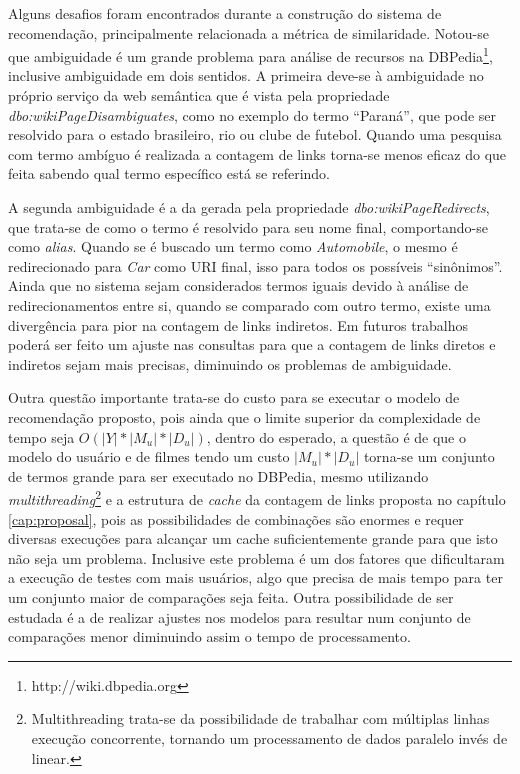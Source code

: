 Alguns desafios foram encontrados durante a construção do sistema de recomendação, principalmente relacionada a métrica de similaridade. Notou-se que ambiguidade é um grande problema para análise de recursos na DBPedia\footnote{http://wiki.dbpedia.org}, inclusive ambiguidade em dois sentidos. A primeira deve-se à ambiguidade no próprio serviço da web semântica que é vista pela propriedade \textit{dbo:wikiPageDisambiguates}, como no exemplo do termo \enquote{Paraná}, que pode ser resolvido para o estado brasileiro, rio ou clube de futebol. Quando uma pesquisa com termo ambíguo é realizada a contagem de links torna-se menos eficaz do que feita sabendo qual termo específico está se referindo. 

A segunda ambiguidade é a da gerada pela propriedade \textit{dbo:wikiPageRedirects}, que trata-se de como o termo é resolvido para seu nome final, comportando-se como \textit{alias}. Quando se é buscado um termo como \textit{Automobile}, o mesmo é redirecionado para \textit{Car} como \ac{URI} final, isso para todos os possíveis \enquote{sinônimos}. Ainda que no sistema sejam considerados termos iguais devido à análise de redirecionamentos entre si, quando se comparado com outro termo, existe uma divergência para pior na contagem de links indiretos. Em futuros trabalhos poderá ser feito um ajuste nas consultas para que a contagem de links diretos e indiretos sejam mais precisas, diminuindo os problemas de ambiguidade.

Outra questão importante trata-se do custo para se executar o modelo de recomendação proposto, pois ainda que o limite superior da complexidade de tempo seja $O(|Y| * |M_u| * |D_u|)$, dentro do esperado, a questão é de que o modelo do usuário e de filmes tendo um custo $|M_u| * |D_u|$ torna-se um conjunto de termos grande para ser executado no DBPedia, mesmo utilizando \textit{multithreading}\footnote{Multithreading trata-se da possibilidade de trabalhar com múltiplas linhas execução concorrente, tornando um processamento de dados paralelo invés de linear.} e a estrutura de \textit{cache} da contagem de links proposta no capítulo \ref{cap:proposal}, pois as possibilidades de combinações são enormes e requer diversas execuções para alcançar um cache suficientemente grande para que isto não seja um problema. Inclusive este problema é um dos fatores que dificultaram a execução de testes com mais usuários, algo que precisa de mais tempo para ter um conjunto maior de comparações seja feita. Outra possibilidade de ser estudada é a de realizar ajustes nos modelos para resultar num conjunto de comparações menor diminuindo assim o tempo de processamento.


